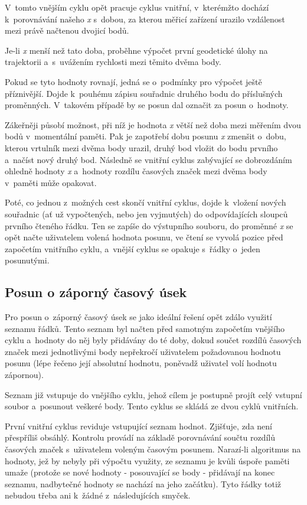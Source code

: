 V~tomto vnějším cyklu opět pracuje cyklus vnitřní, v~kterémžto dochází k~porov\-ná\-vá\-ní našeho
\textit{x} s~dobou, za kterou měřicí zařízení urazilo vzdálenost mezi právě načtenou dvojicí bodů. 

Je-li \textit{x} menší než tato doba, proběhne výpočet první geodetické úlohy na trajektorii
a~s~uvážením rychlosti mezi těmito dvěma body. 

Pokud se tyto hodnoty rovnají, jedná se o~podmínky pro výpočet ještě příznivější. Dojde k~pouhému
zápisu souřadnic druhého bodu do příslušných proměnných. V~ta\-ko\-vém
případě by se posun dal označit za posun o~hodnoty. 

Zákeřněji působí možnost, při níž je hodnota \textit{x} větší než doba mezi měřením dvou
bodů v~momentální paměti. Pak je zapotřebí dobu posunu \textit{x} zmenšit o~dobu, kterou
vrtulník mezi dvěma body urazil, druhý bod vložit do bodu prvního a~načíst nový druhý bod. Následně
se vnitřní cyklus zabývající se dobrozdáním ohledně hodnoty \textit{x} a~hodnoty
rozdílu časových značek mezi dvěma body v~paměti může opakovat. 

Poté, co jednou z~možných cest skončí vnitřní cyklus, dojde k~vložení nových souřadnic
(ať už vypočtených, nebo jen vyjmutých) do odpovídajících sloupců první\-ho čteného řádku.
Ten se zapíše do výstupního souboru, do proměnné \textit{x} se opět načte uživatelem volená
hodnota posunu, ve čtení se vyvolá pozice před započetím vnitřního cyklu, a~vnější cyklus se
opakuje s~řádky o~jeden posunutými. 

\subsection{Posun o záporný časový úsek}
\label{zapornycas}

Pro posun o~záporný časový úsek se jako ideální řešení opět zdálo využití seznamu řádků.
Tento seznam byl načten před samotným započetím vnějšího cyklu a~hodnoty do něj byly
přidávány do té doby, dokud součet rozdílů časových značek mezi jednotlivými body
nepřekročí uživatelem požadovanou hodnotu posunu (lépe řečeno její absolutní hodnotu,
poněvadž uživatel volí hodnotu zápornou). 

Seznam již vstupuje do vnějšího cyklu, jehož cílem je postupně projít celý vstupní
soubor a~posunout veškeré body. Tento cyklus se skládá ze dvou cyklů vnitřních. 

První vnitřní cyklus reviduje vstupující seznam hodnot. Zjišťuje, zda není přes\-příliš obsáhlý.
Kontrolu provádí na základě porovnávání součtu rozdílů časových značek s~uživatelem
voleným časovým posunem. Narazí-li algoritmus na hodnoty, jež by nebyly při výpočtu využity,
ze seznamu je kvůli úspoře paměti umaže (protože se nové hodnoty - posouvající se body - přidávají
na konec seznamu, nadbytečné hodnoty se nachází na jeho začátku). Tyto řádky totiž nebudou
třeba ani k~žádné z~následujících smyček. 

